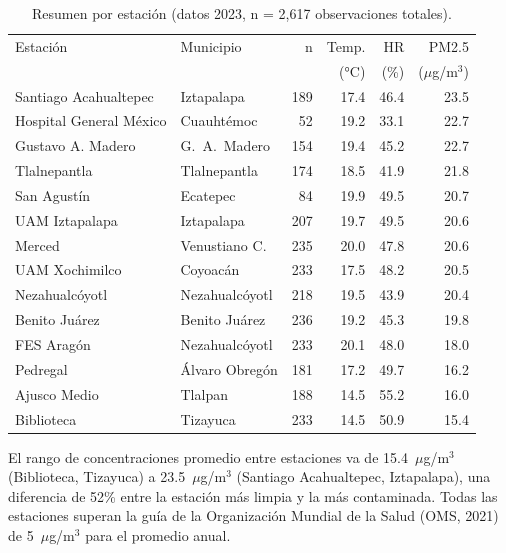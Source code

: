 ﻿\documentclass[12pt]{article}
\begin{document}
\begin{table}[H]
\centering
\caption{Resumen por estaci\'on (datos 2023, n = 2{,}617 observaciones totales).}
\label{tab:estaciones}
\small
\begin{tabular}{>{\raggedright\arraybackslash}p{4.5cm}
                >{\raggedright\arraybackslash}p{2.8cm}rrrr}
\toprule
Estaci\'on & Municipio & n & Temp. & HR & PM2.5 \\
           &           &   & (°C) & (\%) & ($\mu$g/m$^3$) \\
\midrule
Santiago Acahualtepec & Iztapalapa       & 189 & 17.4 & 46.4 & 23.5 \\
Hospital General M\'exico & Cuauht\'emoc & 52  & 19.2 & 33.1 & 22.7 \\
Gustavo A. Madero      & G.~A.~Madero    & 154 & 19.4 & 45.2 & 22.7 \\
Tlalnepantla           & Tlalnepantla    & 174 & 18.5 & 41.9 & 21.8 \\
San Agust\'in          & Ecatepec        & 84  & 19.9 & 49.5 & 20.7 \\
UAM Iztapalapa         & Iztapalapa      & 207 & 19.7 & 49.5 & 20.6 \\
Merced                 & Venustiano C.   & 235 & 20.0 & 47.8 & 20.6 \\
UAM Xochimilco         & Coyoac\'an      & 233 & 17.5 & 48.2 & 20.5 \\
Nezahualc\'oyotl       & Nezahualc\'oyotl& 218 & 19.5 & 43.9 & 20.4 \\
Benito Ju\'arez        & Benito Ju\'arez & 236 & 19.2 & 45.3 & 19.8 \\
FES Arag\'on           & Nezahualc\'oyotl& 233 & 20.1 & 48.0 & 18.0 \\
Pedregal               & \'Alvaro Obreg\'on& 181& 17.2 & 49.7 & 16.2 \\
Ajusco Medio           & Tlalpan         & 188 & 14.5 & 55.2 & 16.0 \\
Biblioteca             & Tizayuca        & 233 & 14.5 & 50.9 & 15.4 \\
\bottomrule
\end{tabular}
\normalsize
\end{table}

El rango de concentraciones promedio entre estaciones va de
15.4~$\mu$g/m$^3$ (Biblioteca, Tizayuca) a
23.5~$\mu$g/m$^3$ (Santiago Acahualtepec, Iztapalapa),
una diferencia de 52\% entre la estaci\'on m\'as limpia y la m\'as
contaminada.
Todas las estaciones superan la gu\'ia de la Organizaci\'on Mundial
de la Salud (OMS, 2021) de 5~$\mu$g/m$^3$ para el promedio anual.
\end{document}
